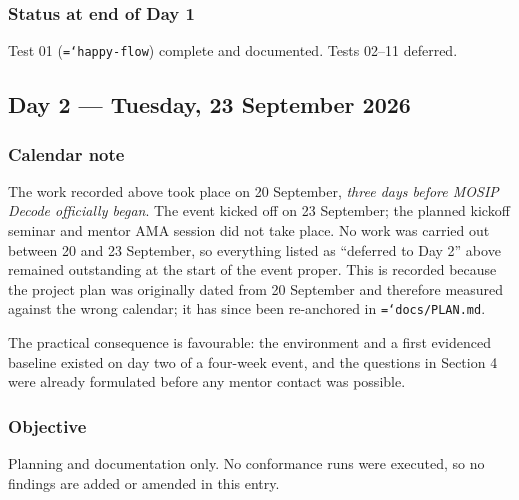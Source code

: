 \documentclass[11pt,a4paper]{article}
\let\origtexttt\texttt
\renewcommand{\texttt}[1]{\origtexttt{\hyphenchar\font=`\-\relax #1}}
\renewcommand{\_}{\textunderscore\allowbreak}
\begin{document}
\subsubsection*{Status at end of Day 1}
Test 01 (\texttt{happy-flow}) complete and documented. Tests 02--11 deferred.

\subsection{Day 2 --- Tuesday, 23 September 2026}

\subsubsection*{Calendar note}
The work recorded above took place on 20 September, \emph{three days before MOSIP Decode
officially began}. The event kicked off on 23 September; the planned kickoff seminar and
mentor AMA session did not take place. No work was carried out between 20 and 23 September,
so everything listed as ``deferred to Day 2'' above remained outstanding at the start of
the event proper. This is recorded because the project plan was originally dated from
20 September and therefore measured against the wrong calendar; it has since been
re-anchored in \texttt{docs/PLAN.md}.

The practical consequence is favourable: the environment and a first evidenced baseline
existed on day two of a four-week event, and the questions in Section 4 were already
formulated before any mentor contact was possible.

\subsubsection*{Objective}
Planning and documentation only. No conformance runs were executed, so no findings are
added or amended in this entry.
\end{document}
